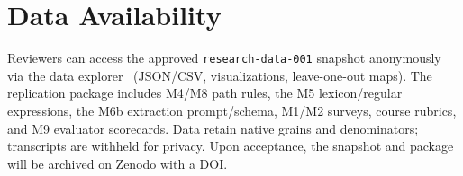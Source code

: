 \section{Data Availability}
Reviewers can access the approved \texttt{research-data-001} snapshot
anonymously via the data explorer~\cite{prism_explorer} (JSON/CSV,
visualizations, leave-one-out maps). The replication package includes M4/M8
path rules, the M5 lexicon/regular expressions, the M6b extraction
prompt/schema, M1/M2 surveys, course rubrics, and M9 evaluator scorecards.
Data retain native grains and denominators; transcripts are withheld for
privacy. Upon acceptance, the snapshot and package will be archived on Zenodo
with a DOI.
